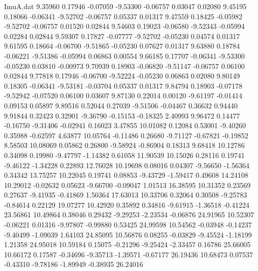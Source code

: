 \begin{filecontents}{ImuA.dat}
   9.35960    0.17946   -0.07059   -9.53300   -0.06757    0.03047    0.02080
   9.45195    0.18066   -0.06341   -9.52702   -0.06757    0.05337    0.01317
   9.47559    0.18425   -0.05982   -9.52702   -0.06757    0.01520    0.02844
   9.54603    0.19023   -0.06580   -9.52343   -0.05994    0.02284    0.02844
   9.59307    0.17827   -0.07777   -9.52702   -0.05230    0.04574    0.01317
   9.61595    0.18664   -0.06700   -9.51865   -0.05230    0.07627    0.01317
   9.63880    0.18784   -0.06221   -9.51386   -0.05994    0.06863    0.00554
   9.66185    0.17707   -0.06341   -9.53300   -0.05230    0.03810   -0.00973
   9.70939    0.18903   -0.06820   -9.51147   -0.06757    0.06100    0.02844
   9.77818    0.17946   -0.06700   -9.52224   -0.05230    0.06863    0.02080
   9.80149    0.18305   -0.06341   -9.53181   -0.03704    0.05337    0.01317
   9.84794    0.18903   -0.07178   -9.52942   -0.07520    0.06100    0.03607
   9.87130    0.22014    0.00120   -9.61197   -0.01414    0.09153    0.05897
   9.89516    0.52044    0.27039   -9.51506   -0.04467    0.36632    0.94440
   9.91844    0.32423    0.32901   -9.36790   -0.15153   -0.18325    2.40993
   9.96472    0.14477   -0.16750   -9.31406   -0.02941    0.16023    3.47855
  10.01082    0.12084    0.53001   -9.40260    0.35988   -0.62597    4.63877
  10.05764   -0.11486    0.26680   -9.71127   -0.67821   -0.19852    8.58503
  10.08069    0.05862    0.26800   -9.58924   -0.86904    0.18313    9.68418
  10.12786    0.34098    0.19980   -9.47797   -1.14382    0.61058   11.90539
  10.15026    0.28116    0.19741   -9.46122   -1.34228    0.22893   12.76028
  10.19698    0.08016    0.04307   -9.56650   -1.56364    0.34342   13.75257
  10.22045    0.19741    0.08853   -9.43729   -1.59417    0.49608   14.24108
  10.29012   -0.02632    0.05623   -9.66700   -0.09047    1.01513   16.38595
  10.31352    0.23569    0.27637   -9.41935   -0.41869    1.50364   17.63013
  10.33706    0.32064    0.30508   -9.25783   -0.84614    0.22129   19.07277
  10.42920    0.35892    0.34816   -9.61915   -1.36518   -0.41224   23.56861
  10.49864    0.38046    0.29432   -9.29253   -2.23534   -0.06876   24.91965
  10.52307   -0.06221    0.01316   -9.97807   -0.99880    0.53425   24.99598
  10.54562   -0.03948   -0.14237   -9.40499   -1.09039    1.64103   24.85095
  10.56876    0.08255   -0.03829   -9.45524   -1.18199    1.21358   24.95018
  10.59184    0.15075   -0.21296   -9.25424   -2.33457    0.16786   25.66005
  10.66172    0.17587   -0.34696   -9.35713   -1.39571   -0.67177   26.19436
  10.68473    0.07537   -0.43310   -9.78186   -1.89949   -0.38935   26.24016

\end{filecontents}
